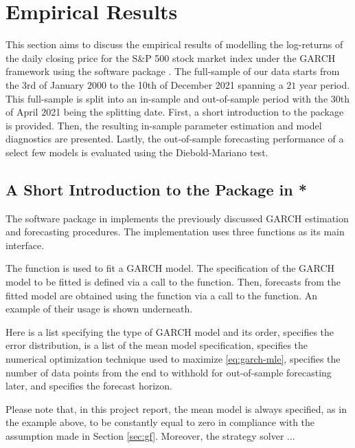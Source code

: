 \newpage
\section{Empirical Results}
This section aims to discuss the empirical results of modelling the log-returns of the daily closing price for the S\&P 500 stock market index under the GARCH framework using the  software package . The full-sample of our data starts from the $3$rd of January $2000$ to the 10th of December 2021 spanning a $21$ year period. This full-sample is split into an in-sample and out-of-sample period with the 30th of April 2021 being the splitting date. First, a short introduction to the  package is provided. Then, the resulting in-sample parameter estimation and model diagnostics are presented. Lastly, the out-of-sample forecasting performance of a select few models is evaluated using the Diebold-Mariano test.

\subsection{A Short Introduction to the  Package in *}\label{ss:intro-rugarch}
The  software package in  implements the previously discussed GARCH estimation and forecasting procedures. The implementation uses three functions as its main interface.

The  function is used to fit a GARCH model. The specification of the GARCH model to be fitted is defined via a call to the  function. Then, forecasts from the fitted model are obtained using the  function via a call to the  function. An example of their usage is shown underneath.

Here  is a list specifying the type of GARCH model and its order,  specifies the error distribution,  is a list of the mean model specification,  specifies the numerical optimization technique used to maximize \eqref{eq:garch-mle},  specifies the number of data points from the end to withhold for out-of-sample forecasting later, and  specifies the forecast horizon.

Please note that, in this project report, the mean model is always specified, as in the example above, to be constantly equal to zero in compliance with the assumption made in Section \ref{sec:gf}. Moreover, the  strategy solver ...

